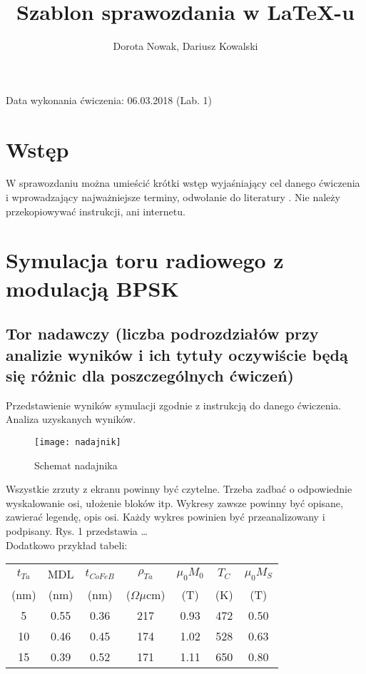 \documentclass{article}
\author{Dorota Nowak, Dariusz Kowalski}		%
\title{Szablon sprawozdania w \LaTeX-u}		%
\date{}
\begin{document}
\maketitle %


Data wykonania ćwiczenia: 06.03.2018 (Lab. 1)
\\

\section{Wstęp}
W sprawozdaniu można umieścić krótki wstęp
wyjaśniający cel danego ćwiczenia i wprowadzający najważniejsze terminy, odwołanie do literatury \cite{USRP, Szostka, IQ, ieee}. Nie należy przekopiowywać instrukcji, ani internetu.

\section{Symulacja toru radiowego z modulacją BPSK}

\subsection{Tor nadawczy (liczba podrozdziałów przy analizie wyników i ich tytuły oczywiście będą się różnic dla poszczególnych ćwiczeń)}

Przedstawienie wyników symulacji zgodnie z instrukcją do danego ćwiczenia. Analiza uzyskanych wyników.


\begin{figure}[H]
\begin{center}
\texttt{[image: nadajnik]}
\end{center}
\caption{Schemat nadajnika}
\label{fig:wykres}
\end{figure}

Wszystkie zrzuty z ekranu powinny być czytelne. Trzeba zadbać o odpowiednie wyskalowanie osi, ułożenie bloków itp. Wykresy zawsze powinny być opisane, zawierać legendę, opis osi. Każdy wykres powinien być przeanalizowany i podpisany. Rys. 1 przedstawia … \\

Dodatkowo przykład tabeli:

\begin{table}[!ht]
\label{tab:Static}
\centering
\begin{tabular}{ccccccc}
$t_{Ta}$ & MDL & $t_{CoFeB}$ & $\rho_{Ta}$ & $\mu_{0}M_{0}$ & $T_{C}$ & $\mu_{0}M_{S}$ \\
(nm) & (nm) & (nm) & ($\Omega\mu$cm) & (T) & (K) & (T) \\
\hline
5 & 0.55 & 0.36 & 217 & 0.93 & 472 & 0.50 \\
10 & 0.46 & 0.45 & 174 & 1.02 & 528 & 0.63 \\
15 & 0.39 & 0.52 & 171 & 1.11 & 650 & 0.80 \\
\end{tabular}
\end{table}
\end{document}
